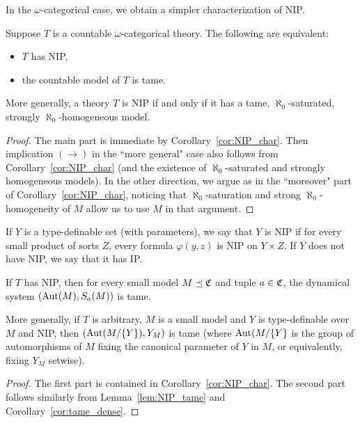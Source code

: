 	
	In the $\omega$-categorical case, we obtain a simpler characterization of NIP.
	\begin{cor}
		Suppose $T$ is a countable $\omega$-categorical theory. The following are equivalent:
		\begin{itemize}
			\item
			$T$ has NIP,
			\item
			the countable model of $T$ is tame.
		\end{itemize}
		More generally, a theory $T$ is NIP if and only if it has a tame, $\aleph_0$-saturated, strongly $\aleph_0$-homogeneous model.
	\end{cor}
	\begin{proof}
		The main part is immediate by Corollary~\ref{cor:NIP_char}.
		Then implication $(\rightarrow)$ in the ``more general" case also follows from Corollary~\ref{cor:NIP_char} (and the existence of $\aleph_0$-saturated and strongly homogeneous models). In the other direction, we argue as in the ``moreover" part of Corollary~\ref{cor:NIP_char}, noticing that $\aleph_0$-saturation and strong $\aleph_0$-homogeneity of $M$ allow us to use $M$ in that argument.
	\end{proof}
	
	\begin{dfn}
		\label{dfn:NIP_set}
		If $Y$ is a type-definable set (with parameters), we say that $Y$ is NIP if for every small product of sorts $Z$, every formula $\varphi(y,z)$ is NIP on $Y\times Z$. If $Y$ does not have NIP, we say that it has IP.\xqed{\lozenge}
	\end{dfn}
	
	\begin{cor}
		\label{cor:NIP_implies_tame}
		If $T$ has NIP, then for every small model $M\preceq {\mathfrak C}$ and tuple $a\in {\mathfrak C}$, the dynamical system $(\operatorname{{Aut}}(M),S_a(M))$ is tame.
		
		More generally, if $T$ is arbitrary, $M$ is a small model and $Y$ is type-definable over $M$ and NIP, then $(\operatorname{{Aut}}(M/\{Y\}),Y_M)$ is tame (where $\operatorname{{Aut}}(M/\{Y\}$ is the group of automorphisms of $M$ fixing the canonical parameter of $Y$ in $M$, or equivalently, fixing $Y_M$ setwise).
	\end{cor}
	\begin{proof}
		The first part is contained in Corollary~\ref{cor:NIP_char}. The second part follows similarly from Lemma~\ref{lem:NIP_tame} and Corollary~\ref{cor:tame_dense}.
	\end{proof}
	

